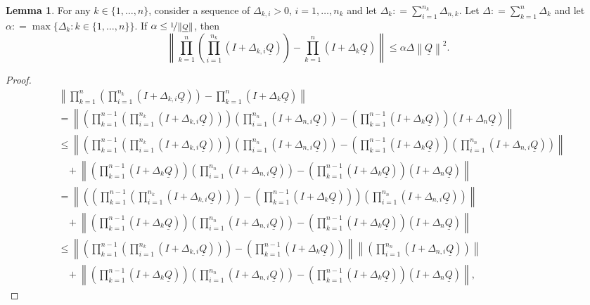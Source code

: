 \documentclass[10pt]{paper}
\theoremstyle{definition}
\newtheorem{lemma}[theorem]{Lemma}
\newcommand{\lrate}{\underline{Q}}
\newcommand{\norm}[1]{\left\lVert #1 \right\rVert}
\newcommand{\coloneqq}{:\!=}
\begin{document}
\begin{lemma}\label{lemma:differencebetweennested_appendix}
For any $k\in\{1,\dots,n\}$, consider a sequence of $\Delta_{k,i}>0$, $i=1,\dots,n_k$ and let $\Delta_k\coloneqq\sum_{i=1}^{n_k}\Delta_{n,k}$. Let $\Delta\coloneqq\sum_{k=1}^n\Delta_k$ and let $\alpha\coloneqq\max\{\Delta_k\colon k\in\{1,\dots,n\}\}$. If $\alpha\leq\nicefrac{1}{\norm{\lrate}}$, then
\begin{equation*}
\norm{\prod_{k=1}^n\left(\prod_{i=1}^{n_k}(I+\Delta_{k,i}\lrate)\right)
-
\prod_{k=1}^n(I+\Delta_k\lrate)
}
\leq\alpha\Delta\norm{\lrate}^2.
\end{equation*}
\end{lemma}
\begin{proof}
\begin{align*}
&\norm{\prod_{k=1}^n\left(\prod_{i=1}^{n_k}(I+\Delta_{k,i}\lrate)\right)
-
\prod_{k=1}^n(I+\Delta_k\lrate)
}\\
&=\norm{\left(\prod_{k=1}^{n-1}\left(\prod_{i=1}^{n_k}(I+\Delta_{k,i}\lrate)\right)\right)\left(\prod_{i=1}^{n_n}(I+\Delta_{n,i}\lrate)\right)
-
\left(\prod_{k=1}^{n-1}(I+\Delta_k\lrate)\right)(I+\Delta_n\lrate)
}\\
&\leq\norm{
\left(\prod_{k=1}^{n-1}\left(\prod_{i=1}^{n_k}(I+\Delta_{k,i}\lrate)\right)\right)\left(\prod_{i=1}^{n_n}(I+\Delta_{n,i}\lrate)\right)
-
\left(\prod_{k=1}^{n-1}(I+\Delta_k\lrate)\right)
\left(\prod_{i=1}^{n_n}(I+\Delta_{n,i}\lrate)\right)
}\\
&~~~~+\norm{
\left(\prod_{k=1}^{n-1}(I+\Delta_k\lrate)\right)
\left(\prod_{i=1}^{n_n}(I+\Delta_{n,i}\lrate)\right)
-
\left(\prod_{k=1}^{n-1}(I+\Delta_k\lrate)\right)(I+\Delta_n\lrate)
}\\
&=\norm{
\left(
\left(
\prod_{k=1}^{n-1}\left(\prod_{i=1}^{n_k}(I+\Delta_{k,i}\lrate)\right)
\right)
-
\left(\prod_{k=1}^{n-1}(I+\Delta_k\lrate)\right)
\right)
\left(\prod_{i=1}^{n_n}(I+\Delta_{n,i}\lrate)\right)
}\\
&~~~~+\norm{
\left(\prod_{k=1}^{n-1}(I+\Delta_k\lrate)\right)
\left(\prod_{i=1}^{n_n}(I+\Delta_{n,i}\lrate)\right)
-
\left(\prod_{k=1}^{n-1}(I+\Delta_k\lrate)\right)(I+\Delta_n\lrate)
}\\
&\leq\norm{
\left(
\prod_{k=1}^{n-1}\left(\prod_{i=1}^{n_k}(I+\Delta_{k,i}\lrate)\right)
\right)
-
\left(\prod_{k=1}^{n-1}(I+\Delta_k\lrate)\right)
}
\norm{
\left(\prod_{i=1}^{n_n}(I+\Delta_{n,i}\lrate)\right)
}\\
&~~~~+\norm{
\left(\prod_{k=1}^{n-1}(I+\Delta_k\lrate)\right)
\left(\prod_{i=1}^{n_n}(I+\Delta_{n,i}\lrate)\right)
-
\left(\prod_{k=1}^{n-1}(I+\Delta_k\lrate)\right)(I+\Delta_n\lrate)
},
\end{align*}


\end{proof}
\end{document}
